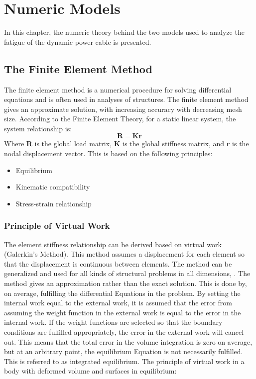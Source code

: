 \chapter{Numeric Models}
\label{chap:numeric}
In this chapter, the numeric theory behind the two models used to analyze the fatigue of the dynamic power cable is presented.

\section{The Finite Element Method}
The finite element method is a numerical procedure for solving differential equations and is often used in analyses of structures. The finite element method gives an approximate solution, with increasing accuracy with decreasing mesh size. According to the Finite Element Theory, for a static linear system, the system relationship is:
\begin{equation}
    \boldsymbol{R}= \boldsymbol{K}\boldsymbol{r}
\end{equation}
Where \textbf{R} is the global load matrix, \textbf{K} is the global stiffness matrix, and \textbf{r} is the nodal displacement vector.\newline
\newline
This is based on the following principles:
\begin{itemize}
    \item Equilibrium
    \item Kinematic compatibility
    \item Stress-strain relationship
\end{itemize}
 \cite{moan2003}
\subsection{Principle of Virtual Work}
The element stiffness relationship can be derived based on virtual work (Galerkin's Method). This method assumes a displacement for each element so that the displacement is continuous between elements. The method can be generalized and used for all kinds of structural problems in all dimensions, \cite{moan2003}. The method gives an approximation rather than the exact solution. This is done by, on average, fulfilling the differential Equations in the problem. By setting the internal work equal to the external work, it is assumed that the error from assuming the weight function in the external work is equal to the error in the internal work. If the weight functions are selected so that the boundary conditions are fulfilled appropriately, the error in the external work will cancel out. This means that the total error in the volume integration is zero on average, but at an arbitrary point, the equilibrium Equation is not necessarily fulfilled. This is referred to as integrated equilibrium. The principle of virtual work in a body with deformed volume and surfaces in equilibrium:   

